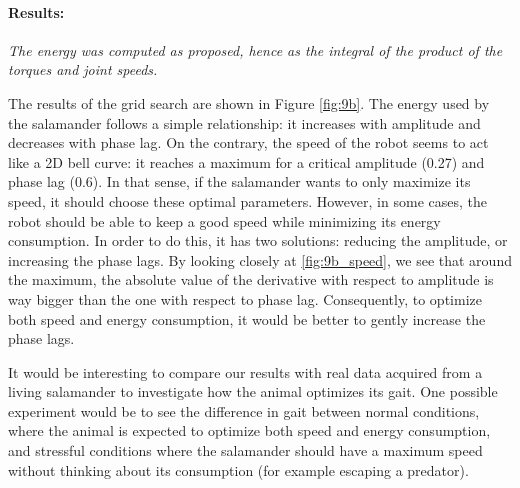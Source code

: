 \documentclass{cmc}
\begin{document}
\paragraph{Results:}
\textit{The energy was computed as proposed, hence as the integral of the product of the torques and joint speeds.}

The results of the grid search are shown in Figure \ref{fig:9b}. The energy used by the salamander follows a simple relationship: it increases with amplitude and decreases with phase lag. On the contrary, the speed of the robot seems to act like a 2D bell curve: it reaches a maximum for a critical amplitude (0.27) and phase lag (0.6). In that sense, if the salamander wants to only maximize its speed, it should choose these optimal parameters. However, in some cases, the robot should be able to keep a good speed while minimizing its energy consumption. In order to do this, it has two solutions: reducing the amplitude, or increasing the phase lags. By looking closely at \ref{fig:9b_speed}, we see that around the maximum, the absolute value of the derivative with respect to amplitude is way bigger than the one with respect to phase lag. Consequently, to optimize both speed and energy consumption, it would be better to gently increase the phase lags. 

It would be interesting to compare our results with real data acquired from a living salamander to investigate how the animal optimizes its gait. One possible experiment would be to see the difference in gait between normal conditions, where the animal is expected to optimize both speed and energy consumption, and stressful conditions where the salamander should have a maximum speed without thinking about its consumption (for example escaping a predator). 
\end{document}
